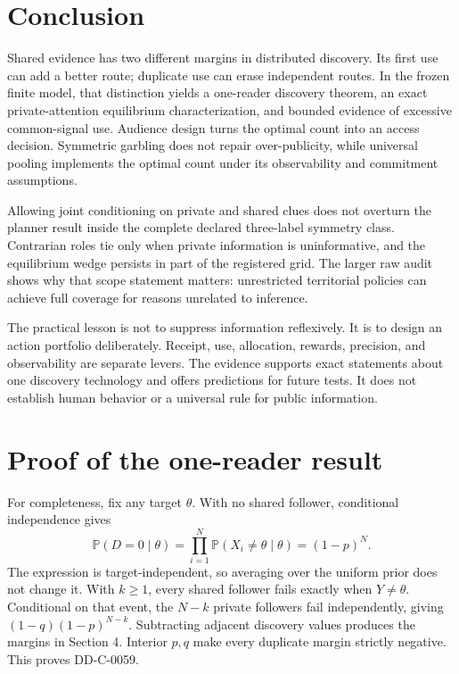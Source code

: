 \documentclass[11pt]{article}
\newcommand{\Prb}{\mathbb{P}}
\begin{document}
\section{Conclusion}

Shared evidence has two different margins in distributed discovery. Its first
use can add a better route; duplicate use can erase independent routes. In the
frozen finite model, that distinction yields a one-reader discovery theorem,
an exact private-attention equilibrium characterization, and bounded evidence
of excessive common-signal use. Audience design turns the optimal count into an
access decision. Symmetric garbling does not repair over-publicity, while
universal pooling implements the optimal count under its observability and
commitment assumptions.

Allowing joint conditioning on private and shared clues does not overturn the
planner result inside the complete declared three-label symmetry class.
Contrarian roles tie only when private information is uninformative, and the
equilibrium wedge persists in part of the registered grid. The larger raw audit
shows why that scope statement matters: unrestricted territorial policies can
achieve full coverage for reasons unrelated to inference.

The practical lesson is not to suppress information reflexively. It is to design
an action portfolio deliberately. Receipt, use, allocation, rewards, precision,
and observability are separate levers. The evidence supports exact statements
about one discovery technology and offers predictions for future tests. It does
not establish human behavior or a universal rule for public information.

\clearpage
\appendix

\section{Proof of the one-reader result}

For completeness, fix any target $\theta$. With no shared follower, conditional
independence gives
\[
 \Prb(D=0\mid\theta)=\prod_{i=1}^N\Prb(X_i\ne\theta\mid\theta)=(1-p)^N.
\]
The expression is target-independent, so averaging over the uniform prior does
not change it. With $k\geq1$, every shared follower fails exactly when
$Y\ne\theta$. Conditional on that event, the $N-k$ private followers fail
independently, giving $(1-q)(1-p)^{N-k}$. Subtracting adjacent discovery values
produces the margins in Section 4. Interior $p,q$ make every duplicate margin
strictly negative. This proves DD-C-0059.
\end{document}
